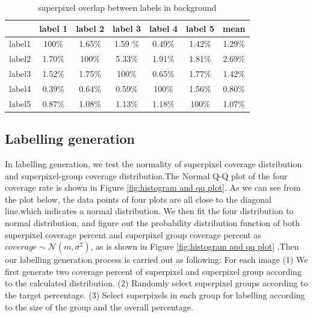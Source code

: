\documentclass[runningheads,a4paper]{llncs}
\begin{document}
\begin{table}[!tb]
\centering
\begin{tabular}{|c|c|c|c|c|c|c|}
\hline
 & label 1 & label 2&label 3&label 4&label 5&mean\\
\hline
label1& 100\% & 1.65\% & 1.59	\%& 0.49\%& 1.42\%& 1.29\%\\
\hline
label2& 1.70\% & 100\% & 5.33\%& 1.91\%& 1.81\%& 2.69\% \\
\hline
label3& 1.52\% & 1.75\% & 100\%& 0.65\%& 1.77\%& 1.42\% \\
\hline
label4& 0.39\% & 0.64\% & 0.59\%& 100\%& 1.56\%& 0.80\%\\
\hline
label5& 0.87\% & 1.08\% & 1.13\%& 1.18\%& 100\%& 1.07\% \\
\hline
\end{tabular}
\captionsetup{justification=centerlast}
\caption{superpixel overlap between labels in background}
\label{ta: sp overlap b}
\end{table}


\subsection{Labelling generation}
In labelling generation, we test the normality of superpixel coverage distribution and superpixel-group coverage distribution.The Normal Q-Q plot of the four coverage rate is shown in Figure \ref{fig:histogram and qq plot}. As we can see from the plot below, the data points of four plots are all close to the diagonal line.which indicates a normal distribution. We then fit the four distribution to normal distribution, and figure out the probability distribution function of both superpixel coverage percent and superpixel group coverage percent as $coverage \sim \mathcal{N} (m,\sigma^2)$, as is shown in Figure \ref{fig:histogram and qq plot} .Then our labelling generation process is carried out as following: For each image (1) We first generate two coverage percent of superpixel and superpixel group according to the calculated  distribution. (2) Randomly select superpixel groups according to the target percentage. (3) Select superpixels in each group for labelling according to the size of the group and the overall percentage.
\end{document}
